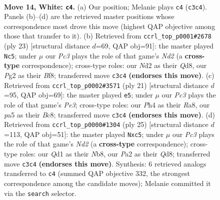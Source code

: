 \documentclass[11pt]{article}
\begin{document}
\clearpage

\begin{figure}[p]\centering
\begin{subfigure}{0.46\textwidth}\centering
\resizebox{\linewidth}{!}{%
\newchessgame
\chessboard[
  setfen={r1b2rk1/2p2p2/2n2np1/ppbqp2p/B6P/2PP1N2/PP1N1PP1/R1BQR1K1 w - - 0 14},
  showmover=false,
  pgfstyle=straightmove, color=movearrow, markmove={c3-c4}
]}
\caption{}
\end{subfigure}\hfill
\begin{subfigure}{0.46\textwidth}\centering
\resizebox{\linewidth}{!}{%
\newchessgame
\chessboard[
  setfen={r1bqrbk1/pp1n1pp1/2pp1n1p/8/P1BQPB2/2N2N1P/1PP2PP1/R3R1K1 b - - 2 12},
  showmover=false,
  pgfstyle=straightmove, color=movearrow, markmove={d7-c5}
]}
\caption{}
\end{subfigure}
\\[4pt]
\begin{subfigure}{0.46\textwidth}\centering
\resizebox{\linewidth}{!}{%
\newchessgame
\chessboard[
  setfen={r1bqkb1r/3n1ppp/3ppn2/pB6/Pp1QP3/1P3N2/2P2PPP/RNB1R1K1 b kq - 1 11},
  showmover=false,
  pgfstyle=straightmove, color=movearrow, markmove={e6-e5}
]}
\caption{}
\end{subfigure}\hfill
\begin{subfigure}{0.46\textwidth}\centering
\resizebox{\linewidth}{!}{%
\newchessgame
\chessboard[
  setfen={rn1q1rk1/1p1nppbp/6p1/p1P1Pb2/P2N4/1QP5/1P2B1PP/RNB2RK1 b - - 2 13},
  showmover=false,
  pgfstyle=straightmove, color=movearrow, markmove={d7-c5}
]}
\caption{}
\end{subfigure}
\caption{\textbf{Move 14, White: \texttt{c4}.} (a) Our position; Melanie plays \texttt{c4} (\texttt{c3c4}). Panels (b)--(d) are the retrieved master positions whose correspondence most drove this move (highest QAP objective among those that transfer to it). (b) Retrieved from \texttt{ccrl\_top\_p0001\#2678} (ply 23) [structural distance $d$=69, QAP obj=91]: the master played \texttt{Nc5}; under $\mu$ our \emph{Pc3} plays the role of that game's \emph{Nd2} (a \textbf{cross-type} correspondence); cross-type roles: our \emph{N}d2 as their \emph{Q}d8, our \emph{P}g2 as their \emph{B}f8; transferred move \texttt{c3c4} \textbf{(endorses this move)}. (c) Retrieved from \texttt{ccrl\_top\_p0002\#3571} (ply 21) [structural distance $d$=95, QAP obj=69]: the master played \texttt{e5}; under $\mu$ our \emph{Pc3} plays the role of that game's \emph{Pe3}; cross-type roles: our \emph{P}h4 as their \emph{R}a8, our \emph{p}a5 as their \emph{B}c8; transferred move \texttt{c3c4} \textbf{(endorses this move)}. (d) Retrieved from \texttt{ccrl\_top\_p0000\#1304} (ply 25) [structural distance $d$=113, QAP obj=51]: the master played \texttt{Nxc5}; under $\mu$ our \emph{Pc3} plays the role of that game's \emph{Nd2} (a \textbf{cross-type} correspondence); cross-type roles: our \emph{Q}d1 as their \emph{N}b8, our \emph{P}a2 as their \emph{Q}d8; transferred move \texttt{c3c4} \textbf{(endorses this move)}. Synthesis: 6 retrieved analogs transferred to \texttt{c4} (summed QAP objective 332, the strongest correspondence among the candidate moves); Melanie committed it via the \texttt{search} selector.}
\label{fig:thought-m26}
\end{figure}
\end{document}
